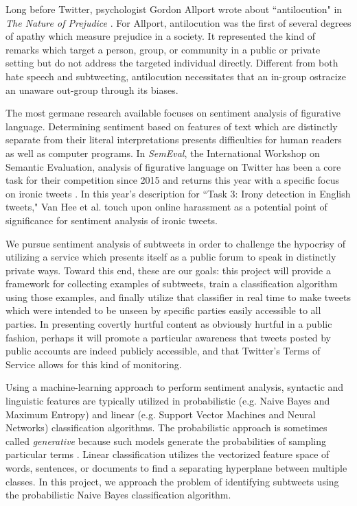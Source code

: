 \documentclass[11pt, twoside, reqno]{book}
\begin{document}
Long before Twitter, psychologist Gordon Allport wrote about ``antilocution" in \textit{The Nature of Prejudice} \cite{antilocution}. For Allport, antilocution was the first of several degrees of apathy which measure prejudice in a society. It represented the kind of remarks which target a person, group, or community in a public or private setting but do not address the targeted individual directly. Different from both hate speech and subtweeting, antilocution necessitates that an in-group ostracize an unaware out-group through its biases.

The most germane research available focuses on sentiment analysis of figurative language. Determining sentiment based on features of text which are distinctly separate from their literal interpretations presents difficulties for human readers as well as computer programs. In \textit{SemEval}, the International Workshop on Semantic Evaluation, analysis of figurative language on Twitter has been a core task for their competition since 2015 \cite{semeval_2015} and returns this year with a specific focus on ironic tweets \cite{semeval_2018}. In this year's description for ``Task 3: Irony detection in English tweets," Van Hee et al. touch upon online harassment as a potential point of significance for sentiment analysis of ironic tweets.  

We pursue sentiment analysis of subtweets in order to challenge the hypocrisy of utilizing a service which presents itself as a public forum to speak in distinctly private ways. Toward this end, these are our goals: this project will provide a framework for collecting examples of subtweets, train a classification algorithm using those examples, and finally utilize that classifier in real time to make tweets which were intended to be unseen by specific parties easily accessible to all parties. In presenting covertly hurtful content as obviously hurtful in a public fashion, perhaps it will promote a particular awareness that tweets posted by public accounts are indeed publicly accessible, and that Twitter's Terms of Service \cite{twitter_tos} allows for this kind of monitoring. 

Using a machine-learning approach to perform sentiment analysis, syntactic and linguistic features are typically utilized in probabilistic (e.g. Naive Bayes and Maximum Entropy) and linear (e.g. Support Vector Machines and Neural Networks) classification algorithms. The probabilistic approach is sometimes called \textit{generative} because such models generate the probabilities of sampling particular terms \cite{sentiment_survey}. Linear classification utilizes the vectorized feature space of words, sentences, or documents to find a separating hyperplane between multiple classes. In this project, we approach the problem of identifying subtweets using the probabilistic Naive Bayes classification algorithm.
\end{document}
